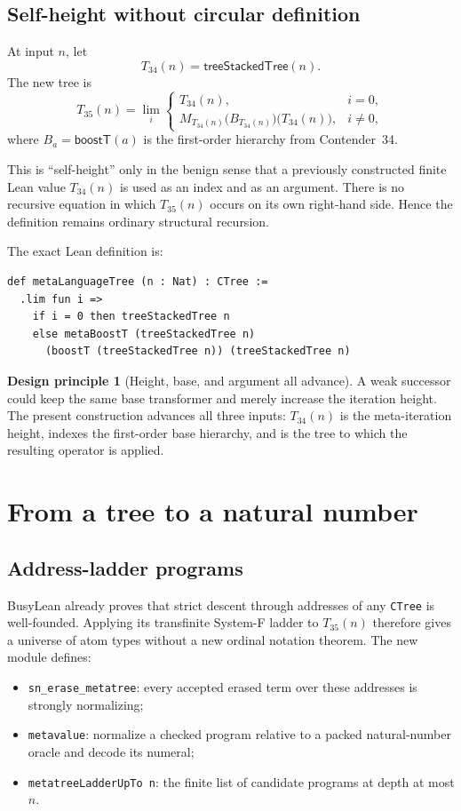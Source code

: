 \documentclass[11pt]{article}
\theoremstyle{definition}
\newtheorem{designprinciple}[theorem]{Design principle}
\newcommand{\code}[1]{\texttt{#1}}
\begin{document}
\subsection{Self-height without circular definition}

At input \(n\), let
\[
  T_{34}(n)=\mathsf{treeStackedTree}(n).
\]
The new tree is
\[
  T_{35}(n)
  = \lim_i
  \begin{cases}
    T_{34}(n), & i=0,\\
    M_{T_{34}(n)}
      \bigl(B_{T_{34}(n)}\bigr)
      \bigl(T_{34}(n)\bigr), & i\ne0,
  \end{cases}
\]
where \(B_a=\mathsf{boostT}(a)\) is the first-order hierarchy from
Contender~34.

This is ``self-height'' only in the benign sense that a previously constructed
finite Lean value \(T_{34}(n)\) is used as an index and as an argument.  There
is no recursive equation in which \(T_{35}(n)\) occurs on its own right-hand
side.  Hence the definition remains ordinary structural recursion.

The exact Lean definition is:
\begin{lstlisting}
def metaLanguageTree (n : Nat) : CTree :=
  .lim fun i =>
    if i = 0 then treeStackedTree n
    else metaBoostT (treeStackedTree n)
      (boostT (treeStackedTree n)) (treeStackedTree n)
\end{lstlisting}

\begin{designprinciple}[Height, base, and argument all advance]
A weak successor could keep the same base transformer and merely increase the
iteration height.  The present construction advances all three inputs:
\(T_{34}(n)\) is the meta-iteration height, indexes the first-order base
hierarchy, and is the tree to which the resulting operator is applied.
\end{designprinciple}

\section{From a tree to a natural number}

\subsection{Address-ladder programs}

BusyLean already proves that strict descent through addresses of any
\code{CTree} is well-founded.  Applying its transfinite System-F ladder to
\(T_{35}(n)\) therefore gives a universe of atom types without a new ordinal
notation theorem.  The new module defines:
\begin{itemize}[leftmargin=2em]
  \item \code{sn\_erase\_metatree}: every accepted erased term over these
  addresses is strongly normalizing;
  \item \code{metavalue}: normalize a checked program relative to a packed
  natural-number oracle and decode its numeral;
  \item \code{metatreeLadderUpTo n}: the finite list of candidate programs at
  depth at most \(n\).
\end{itemize}
\end{document}
